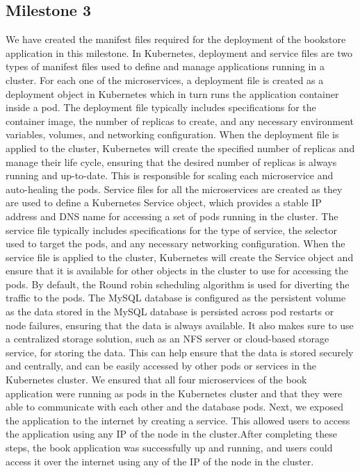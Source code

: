 \subsection{Milestone 3}
We have created the manifest files required for the deployment of the bookstore application in this milestone. In Kubernetes, deployment and service files are two types of manifest files used to define and manage applications running in a cluster. For each one of the microservices, a deployment file is created as a deployment object in Kubernetes which in turn runs the application container inside a pod. The deployment file typically includes specifications for the container image, the number of replicas to create, and any necessary environment variables, volumes, and networking configuration. When the deployment file is applied to the cluster, Kubernetes will create the specified number of replicas and manage their life cycle, ensuring that the desired number of replicas is always running and up-to-date. This is responsible for scaling each microservice and auto-healing the pods. Service files for all the microservices are created as they are used to define a Kubernetes Service object, which provides a stable IP address and DNS name for accessing a set of pods running in the cluster. The service file typically includes specifications for the type of service, the selector used to target the pods, and any necessary networking configuration. When the service file is applied to the cluster, Kubernetes will create the Service object and ensure that it is available for other objects in the cluster to use for accessing the pods. By default, the Round robin scheduling algorithm is used for diverting the traffic to the pods. The MySQL database is configured as the persistent volume as the data stored in the MySQL database is persisted across pod restarts or node failures, ensuring that the data is always available. It also makes sure to use a centralized storage solution, such as an NFS server or cloud-based storage service, for storing the data. This can help ensure that the data is stored securely and centrally, and can be easily accessed by other pods or services in the Kubernetes cluster. We ensured that all four microservices of the book application were running as pods in the Kubernetes cluster and that they were able to communicate with each other and the database pods. Next, we exposed the application to the internet by creating a service. This allowed users to access the application using any IP of the node in the cluster.After completing these steps, the book application was successfully up and running, and users could access it over the internet using any of the IP of the node in the cluster.




